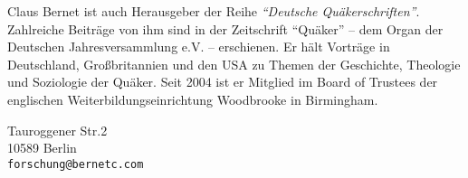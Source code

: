 \begin{footnotesize}
\medskip


Claus Bernet ist auch Herausgeber der Reihe \textit{"`Deutsche Quäkerschriften"'}. Zahlreiche
Beiträge von ihm sind in der Zeitschrift "`Quäker"' -- dem Organ der Deutschen
Jahresversammlung e.V. -- erschienen.
Er hält Vorträge in Deutschland, Großbritannien und den USA zu Themen der Geschichte, Theologie und Soziologie
der Quäker. Seit 2004 ist er Mitglied im Board of Trustees der englischen
Weiterbildungseinrichtung Woodbrooke in Birmingham.

\medskip

\begin{center}
\parbox{7,5cm}{
Tauroggener Str.2
\\10589 Berlin
\\\texttt{forschung@bernetc.com}
}
\end{center}

\end{footnotesize}
